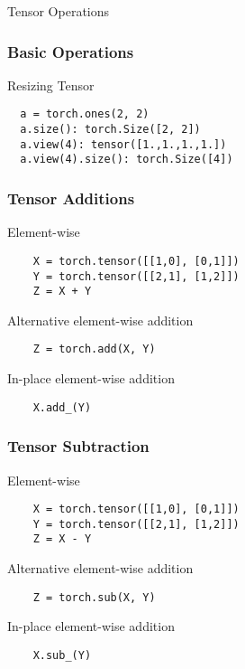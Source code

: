 \documentclass[14 pt]{beamer}
\begin{document}
\begin{frame}
  \begin{center}
    \Large{Tensor Operations}
  \end{center}
\end{frame}

\begin{frame}[fragile]
  \frametitle{Basic Operations}
  \begin{block}{Resizing Tensor}
\begin{verbatim}
  a = torch.ones(2, 2)
  a.size(): torch.Size([2, 2])
  a.view(4): tensor([1.,1.,1.,1.])
  a.view(4).size(): torch.Size([4])
\end{verbatim}
  \end{block}
\end{frame}
\begin{frame}[fragile]
  \frametitle{Tensor Additions}
  \begin{block}{Element-wise}
\begin{verbatim}
    X = torch.tensor([[1,0], [0,1]]) 
    Y = torch.tensor([[2,1], [1,2]]) 
    Z = X + Y 
\end{verbatim}
  \end{block}
  \begin{block}{Alternative element-wise addition}
\begin{verbatim}
    Z = torch.add(X, Y)
\end{verbatim}
  \end{block}
  \begin{block}{In-place element-wise addition}
\begin{verbatim}
    X.add_(Y) 
\end{verbatim}
  \end{block}
\end{frame}

\begin{frame}[fragile]
  \frametitle{Tensor Subtraction}
  \begin{block}{Element-wise}
\begin{verbatim}
    X = torch.tensor([[1,0], [0,1]]) 
    Y = torch.tensor([[2,1], [1,2]]) 
    Z = X - Y 
\end{verbatim}
  \end{block}
  \begin{block}{Alternative element-wise addition}
\begin{verbatim}
    Z = torch.sub(X, Y)
\end{verbatim}
  \end{block}
  \begin{block}{In-place element-wise addition}
\begin{verbatim}
    X.sub_(Y) 
\end{verbatim}
  \end{block}
\end{frame}
\end{document}
